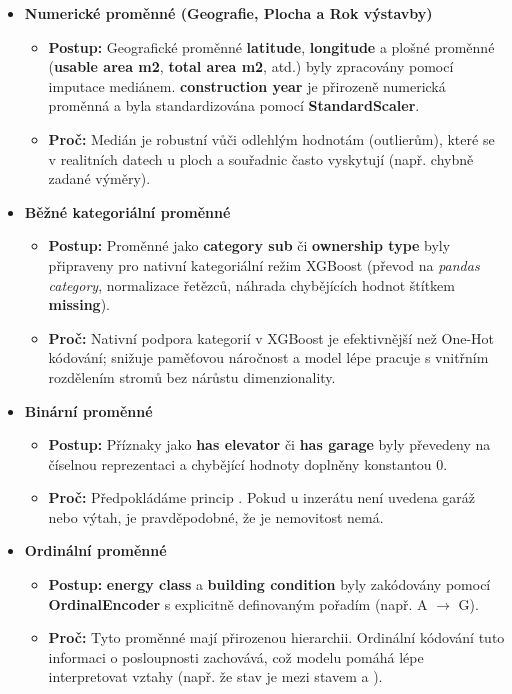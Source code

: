 \begin{itemize}
    \item \textbf{Numerické proměnné (Geografie, Plocha a Rok výstavby)}
    \begin{itemize}
        \item \textbf{Postup:} Geografické proměnné \textbf{latitude}, \textbf{longitude} a plošné proměnné (\textbf{usable area m2}, \textbf{total area m2}, atd.) byly zpracovány pomocí imputace mediánem. \textbf{construction year} je přirozeně numerická proměnná a byla standardizována pomocí \textbf{StandardScaler}.
        \item \textbf{Proč:} Medián je robustní vůči odlehlým hodnotám (outlierům), které se v realitních datech u ploch a souřadnic často vyskytují (např. chybně zadané výměry).
    \end{itemize}

    \item \textbf{Běžné kategoriální proměnné}
    \begin{itemize}
        \item \textbf{Postup:} Proměnné jako \textbf{category sub} či \textbf{ownership type} byly připraveny pro nativní kategoriální režim XGBoost (převod na \textit{pandas category}, normalizace řetězců, náhrada chybějících hodnot štítkem \textbf{missing}).
        \item \textbf{Proč:} Nativní podpora kategorií v XGBoost je efektivnější než One-Hot kódování; snižuje paměťovou náročnost a model lépe pracuje s vnitřním rozdělením stromů bez nárůstu dimenzionality.
    \end{itemize}

    \item \textbf{Binární proměnné}
    \begin{itemize}
        \item \textbf{Postup:} Příznaky jako \textbf{has elevator} či \textbf{has garage} byly převedeny na číselnou reprezentaci a chybějící hodnoty doplněny konstantou 0.
        \item \textbf{Proč:} Předpokládáme princip . Pokud u inzerátu není uvedena garáž nebo výtah, je pravděpodobné, že je nemovitost nemá.
    \end{itemize}

    \item \textbf{Ordinální proměnné}
    \begin{itemize}
        \item \textbf{Postup:} \textbf{energy class} a \textbf{building condition} byly zakódovány pomocí \textbf{OrdinalEncoder} s explicitně definovaným pořadím (např. A $\rightarrow$ G).
        \item \textbf{Proč:} Tyto proměnné mají přirozenou hierarchii. Ordinální kódování tuto informaci o posloupnosti zachovává, což modelu pomáhá lépe interpretovat vztahy (např. že stav  je mezi stavem  a ).
    \end{itemize}


\end{itemize}
